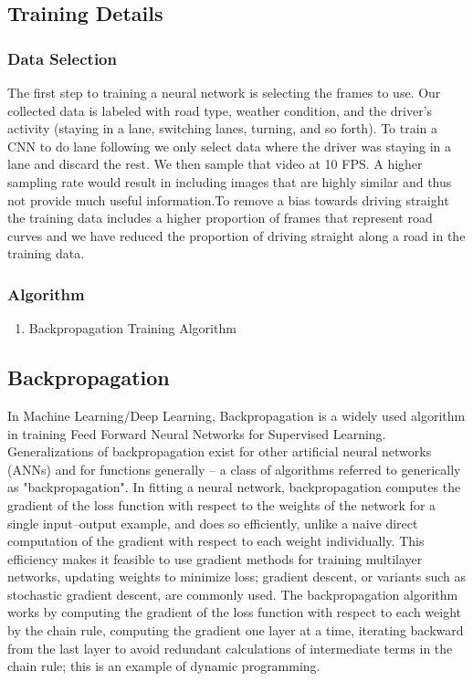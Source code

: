 \subsection{Training Details }
\subsubsection{Data Selection}

The first step to training a neural network is selecting the frames to use. Our collected data is labeled with road type, weather condition, and the driver’s activity (staying in a lane, switching lanes, turning, and so forth). To train a CNN to do lane following we only select data where the driver was staying in a lane and discard the rest. We then sample that video at 10 FPS. A higher sampling rate would result in including images that are highly similar and thus not provide much useful information.To remove a bias towards driving straight the training data includes a higher proportion of frames that represent road curves and we have reduced the proportion of driving  straight along a road in the training data. 
\subsubsection{Algorithm}
\begin{enumerate}
	\item Backpropagation Training Algorithm	
\end{enumerate}
\subsection{Backpropagation}
In Machine Learning/Deep Learning, Backpropagation is a widely used algorithm in training Feed Forward Neural Networks for Supervised Learning. Generalizations of backpropagation exist for other artificial neural networks (ANNs) and for functions generally – a class of algorithms referred to generically as "backpropagation". In fitting a neural network, backpropagation computes the gradient of the loss function with respect to the weights of the network for a single input–output example, and does so efficiently, unlike a naive direct computation of the gradient with respect to each weight individually. This efficiency makes it feasible to use gradient methods for training multilayer networks, updating weights to minimize loss; gradient descent, or variants such as stochastic gradient descent, are commonly used. The backpropagation algorithm works by computing the gradient of the loss function with respect to each weight by the chain rule, computing the gradient one layer at a time, iterating backward from the last layer to avoid redundant calculations of intermediate terms in the chain rule; this is an example of dynamic programming.


